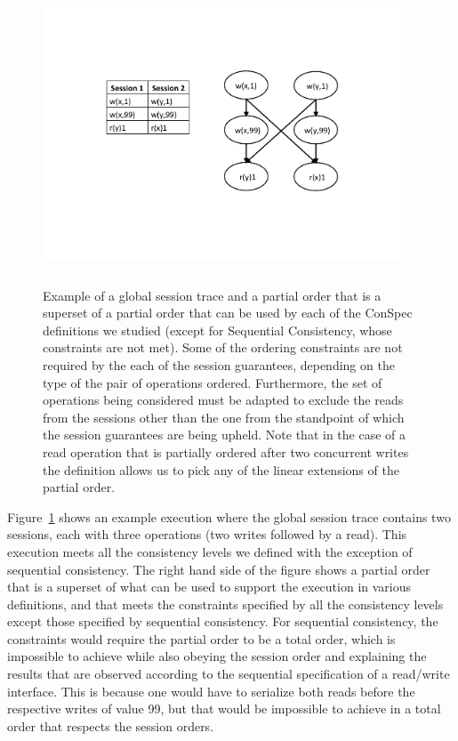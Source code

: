 \documentclass[journal,compsoc]{IEEEtran}
\begin{document}
\begin{figure}%
        \includegraphics[width=4.2in,height=3.5in]
                    {examplepo} %
        \caption{Example of a global session trace and a partial order that is a superset of a partial order that can be used by each of the ConSpec definitions we studied (except for Sequential Consistency, whose constraints are not met). Some of the ordering constraints are not required by the each of the session guarantees, depending on the type of the pair of operations ordered. Furthermore, the set of operations being considered must be adapted to exclude the reads from the sessions other than the one from the standpoint of which the session guarantees are being upheld. Note that in the case of a read operation that is partially ordered after two concurrent writes the definition allows us to pick any of the linear extensions of the partial order.}
        \label{fig:example}
\end{figure}

\par Figure~\ref{fig:example} shows an example execution where the global session trace contains two sessions, each with three operations (two writes followed by a read). This execution meets all the consistency levels we defined with the exception of sequential consistency. The right hand side of the figure shows a partial order that is a superset of what can be used to support the execution in various definitions, and that meets the constraints specified by all the consistency levels except those specified by sequential consistency. For sequential consistency, the constraints would require the partial order to be a total order, which is impossible to achieve while also obeying the session order and explaining the results that are observed according to the sequential specification of a read/write interface. This is because one would have to serialize both reads before the respective writes of value 99, but that would be impossible to achieve in a total order that respects the session orders.
\end{document}
